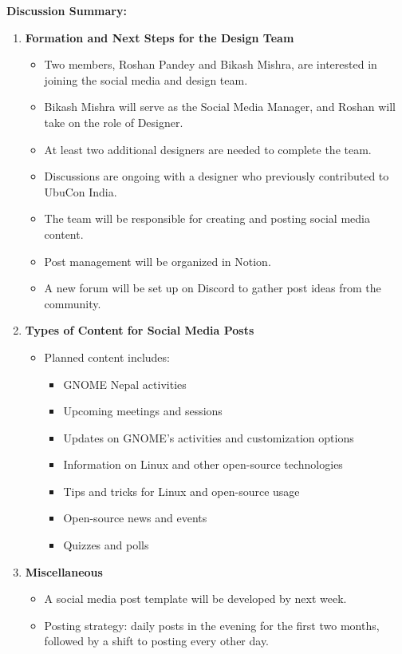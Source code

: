 \documentclass[a4paper,12pt]{article}
\begin{document}
\noindent\textbf{Discussion Summary:}
\begin{enumerate}[label=\arabic*.]
    \item \textbf{Formation and Next Steps for the Design Team}
    \begin{itemize}
        \item Two members, Roshan Pandey and Bikash Mishra, are interested in joining the social media and design team.
        \item Bikash Mishra will serve as the Social Media Manager, and Roshan will take on the role of Designer.
        \item At least two additional designers are needed to complete the team.
        \item Discussions are ongoing with a designer who previously contributed to UbuCon India.
        \item The team will be responsible for creating and posting social media content.
        \item Post management will be organized in Notion.
        \item A new forum will be set up on Discord to gather post ideas from the community.
    \end{itemize}

    \item \textbf{Types of Content for Social Media Posts}
    \begin{itemize}
        \item Planned content includes:
        \begin{itemize}
            \item GNOME Nepal activities
            \item Upcoming meetings and sessions
            \item Updates on GNOME’s activities and customization options
            \item Information on Linux and other open-source technologies
            \item Tips and tricks for Linux and open-source usage
            \item Open-source news and events
            \item Quizzes and polls
        \end{itemize}
    \end{itemize}

    \item \textbf{Miscellaneous}
    \begin{itemize}
        \item A social media post template will be developed by next week.
        \item Posting strategy: daily posts in the evening for the first two months, followed by a shift to posting every other day.
    \end{itemize}
\end{enumerate}
\end{document}

